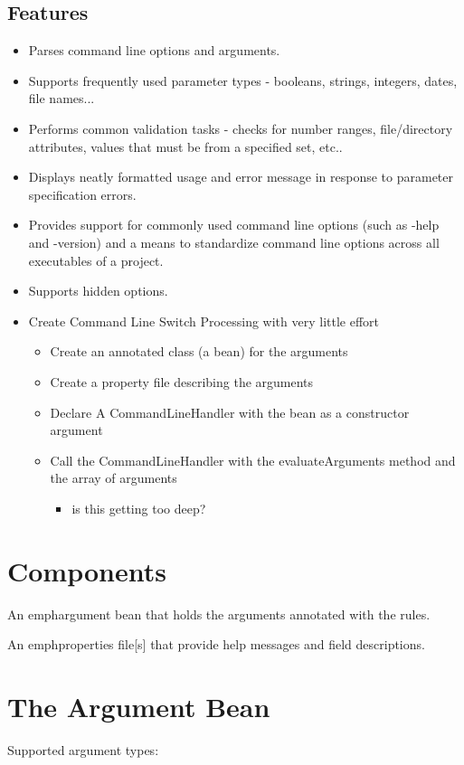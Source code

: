 \documentclass[a4paper,10pt]{article}
\begin{document}
\subsection{Features}
\begin{itemize}
    \item  Parses command line options and arguments.
    \item Supports frequently used parameter types - booleans, strings, integers, dates, file names...
    \item Performs common validation tasks - checks for number ranges, file/directory attributes, values that must be from a specified set, etc..
    \item Displays neatly formatted usage and error message in response to parameter specification errors.
    \item Provides support for commonly used command line options (such as -help and -version) and a means to standardize command line options across all executables of a project.
    \item Supports hidden options.
\end{itemize}
\begin{itemize}
	\item Create Command Line Switch Processing with very little effort
	\begin{itemize}
		\item Create an annotated class (a bean) for the arguments 
		\item Create a property file describing the arguments
		\item Declare A CommandLineHandler with the bean as a constructor argument
		\item Call the CommandLineHandler with the evaluateArguments method and the array of arguments
		\begin{itemize}
		   \item is this getting too deep?
	   \end{itemize}
	\end{itemize}
\end{itemize} 

\section{Components}
An emph{argument bean} that holds the arguments annotated with the rules.

An emph{properties file[s]} that provide help messages and field descriptions.

\section{The Argument Bean}
Supported argument types:
\end{document}
